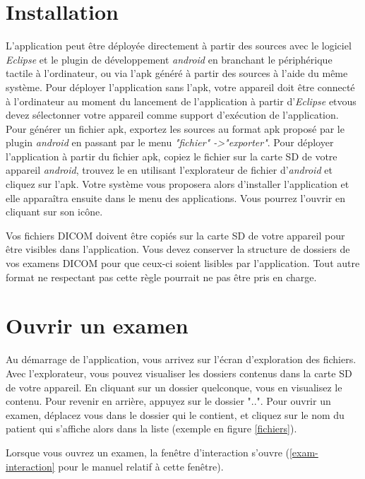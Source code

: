 \section{Installation}

L'application peut être déployée directement à partir des sources avec le logiciel \emph{Eclipse} et le plugin de développement \emph{android} en branchant le périphérique tactile à l'ordinateur, ou via l'apk généré à partir des sources à l'aide du même système. Pour déployer l'application sans l'apk, votre appareil doit être connecté à l'ordinateur au moment du lancement de l'application à partir d'\emph{Eclipse} etvous devez sélectonner votre appareil comme support d'exécution de l'application. Pour générer un fichier apk, exportez les sources au format apk proposé par le plugin \emph{android} en passant par le menu \emph{"fichier"
->"exporter"}. Pour déployer l'application à partir du fichier apk, copiez le fichier sur la carte SD de votre appareil \emph{android}, trouvez le en utilisant l'explorateur de fichier d'\emph{android} et cliquez sur l'apk. Votre système vous proposera alors d'installer l'application et elle apparaîtra ensuite dans le menu des applications. Vous pourrez l'ouvrir en cliquant sur son icône.

\begin{note}
Vos fichiers DICOM doivent être copiés sur la carte SD de votre appareil pour être visibles dans l'application. Vous devez conserver la structure de dossiers de vos examens DICOM pour que ceux-ci soient lisibles par l'application. Tout autre format ne respectant pas cette règle pourrait ne pas être pris en charge.
\end{note}

\section{Ouvrir un examen}

Au démarrage de l'application, vous arrivez sur l'écran d'exploration des fichiers. Avec l'explorateur, vous pouvez visualiser les dossiers contenus dans la carte SD de votre appareil. En cliquant sur un dossier quelconque, vous en visualisez le contenu. Pour revenir en arrière, appuyez sur le dossier "..". Pour ouvrir un examen, déplacez vous dans le dossier qui le contient, et cliquez sur le nom du patient qui s'affiche alors dans la liste (exemple en figure \vref{fichiers}).

Lorsque vous ouvrez un examen, la fenêtre d'interaction s'ouvre (\vref{exam-interaction} pour le manuel relatif à cette fenêtre).

